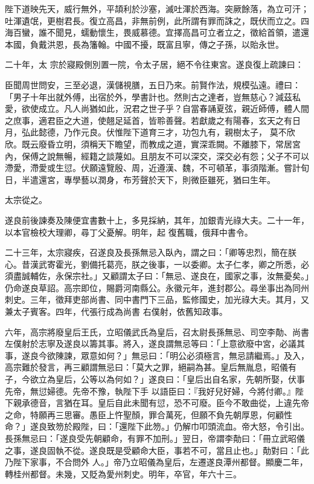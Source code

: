 \begin{pinyinscope}
 陛下道映先天，威行無外，平頡利於沙塞，滅吐渾於西海。突厥餘落，為立可汗；吐渾遺氓，更樹君長。復立高昌，非無前例，此所謂有罪而誅之，既伏而立之。四海百蠻，誰不聞見，蠕動懷生，畏威慕德。宜擇高昌可立者立之，徵給首領，遣還本國，負戴洪恩，長為籓翰。中國不擾，既富且寧，傳之子孫，以貽永世。



 二十年，太
 宗於寢殿側別置一院，令太子居，絕不令往東宮。遂良復上疏諫曰：



 臣聞周世問安，三至必退，漢儲視膳，五日乃來。前賢作法，規模弘遠。禮曰：「男子十年出就外傅，出宿於外，學書計也。然則古之達者，豈無慈心？減茲私愛，欲使成立。凡人尚猶如此，況君之世子乎？自當春誦夏弦，親近師傅，體人間之庶事，適君臣之大道，使翹足延首，皆聆善聲。若獻歲之有陽春，玄天之有日月，弘此懿德，乃作元良。伏惟陛下道育三才，功包九有，親樹太子，
 莫不欣欣。既云廢昏立明，須稱天下瞻望，而教成之道，實深乖闕。不離膝下，常居宮內，保傅之說無暢，經籍之談蔑如。且朋友不可以深交，深交必有怨；父子不可以滯愛，滯愛或生愆。伏願遠覽殷、周，近遵漢、魏，不可頓革，事須階漸。嘗計旬日，半遣還宮，專學藝以潤身，布芳聲於天下，則微臣雖死，猶曰生年。



 太宗從之。



 遂良前後諫奏及陳便宜書數十上，多見採納，其年，加銀青光祿大夫。二十一年，以本官檢校大理卿，尋丁父憂解。明年，起
 復舊職，俄拜中書令。



 二十三年，太宗寢疾，召遂良及長孫無忌入臥內，謂之曰：「卿等忠烈，簡在朕心。昔漢武寄霍光，劉備托葛亮，朕之後事，一以委卿。太子仁孝，卿之所悉，必須盡誠輔佐，永保宗社。」又顧謂太子曰：「無忌、遂良在，國家之事，汝無憂矣。」仍命遂良草詔。高宗即位，賜爵河南縣公。永徽元年，進封郡公。尋坐事出為同州刺史。三年，徵拜吏部尚書、同中書門下三品，監修國史，加光祿大夫。其月，又兼太子賓客。四年，代張行成為尚書
 右僕射，依舊知政事。



 六年，高宗將廢皇后王氏，立昭儀武氏為皇后，召太尉長孫無忌、司空李勣、尚書左僕射於志寧及遂良以籌其事。將入，遂良謂無忌等曰：「上意欲廢中宮，必議其事，遂良今欲陳諫，眾意如何？」無忌曰：「明公必須極言，無忌請繼焉。」及入，高宗難於發言，再三顧謂無忌曰：「莫大之罪，絕嗣為甚。皇后無胤息，昭儀有子，今欲立為皇后，公等以為何如？」遂良曰：「皇后出自名家，先朝所娶，伏事先帝，無愆婦德。先帝不豫，執陛下手
 以語臣曰：『我好兒好婦，今將付卿。』陛下親承德音，言猶在耳。皇后自此未聞有愆，恐不可廢。臣今不敢曲從，上違先帝之命，特願再三思審。愚臣上忤聖顏，罪合萬死，但願不負先朝厚恩，何顧性命？」遂良致笏於殿陛，曰：「還陛下此笏。」仍解巾叩頭流血。帝大怒，令引出。長孫無忌曰：「遂良受先朝顧命，有罪不加刑。」翌日，帝謂李勣曰：「冊立武昭儀之事，遂良固執不從。遂良既是受顧命大臣，事若不可，當且止也。」勣對曰：「此乃陛下家事，不合問外
 人。」帝乃立昭儀為皇后，左遷遂良潭州都督。顯慶二年，轉桂州都督。未幾，又貶為愛州刺史。明年，卒官，年六十三。




\end{pinyinscope}

